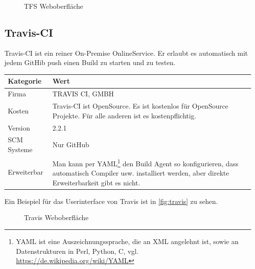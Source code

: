 \begin{figure}[H]
  \centering
  \caption{TFS Weboberfläche \cite{TFS-Marketing}}\label{fig:tfs_release_pipeline}
\end{figure}
\subsection{Travis-CI}
Travis-CI ist ein reiner On-Premise OnlineService. Er erlaubt es automatisch mit jedem GitHib push einen Build zu starten und zu testen.
\begin{center}
  \begin{tabularx}{\textwidth}{lX}
    \toprule
    Kategorie & Wert \\
    \midrule
    Firma &  TRAVIS CI, GMBH \\
		\addlinespace
    Kosten & Travis-CI ist OpenSource. Es ist kostenlos für OpenSource Projekte. Für alle anderen ist es kostenpflichtig.\\
		\addlinespace
		Version & 2.2.1 \\
		\addlinespace
		SCM Systeme & Nur GitHub\\
		\addlinespace
		Erweiterbar & Man kann per YAML\footnote{YAML ist eine Auszeichnungssprache, die an XML angelehnt ist, sowie an Datenstrukturen in Perl, Python, C, vgl. \url{https://de.wikipedia.org/wiki/YAML}} den Build Agent so konfigurieren, dass automatisch Compiler usw. installiert werden, aber direkte Erweiterbarkeit gibt es nicht.\\
    \bottomrule
  \end{tabularx}
\end{center}
Ein Beispiel für das Userinterface von Travis ist in \autoref{fig:travis} zu sehen. 

\begin{figure}[H]
  \centering
  \caption{Travis Weboberfläche \cite{Travis-build}}\label{fig:travis}
\end{figure}